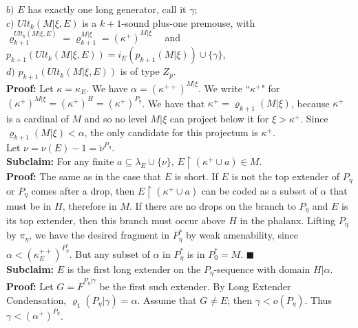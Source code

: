 \documentclass[12pt]{article}
\begin{document}
\indent $b)$ $E$ has exactly one long generator, call it $\gamma$;\\

\indent $c)$ $Ult_k (M | \xi , E)$ is a $k+1$-sound plus-one premouse, with\\

\indent \indent $\varrho_{k+1}^{Ult_k (M | \xi , E)} = \varrho_{k+1}^{M | \xi} = (\kappa^+ )^{M | \xi}$ \ \ and \ \ $p_{k+1} (Ult_k (M | \xi , E )) = i_E (p_{k+1} (M | \xi)) \cup \{ \gamma \}$,\\

\indent $d)$ $p_{k+1} (Ult_k (M | \xi , E))$ is of type $Z_p$.\\

\indent \indent \textbf{Proof:} Let $\kappa = \kappa_E$.  We have $\alpha = (\kappa^{++})^{M | \xi}$.  We write ``$\kappa^+$" for $(\kappa^+ )^{M | \xi} = (\kappa^+)^H = (\kappa^+)^{P_\eta}$.  We have that $\kappa^+ = \varrho_{k+1} (M | \xi)$, because $\kappa^+$ is a cardinal of $M$ and so no level $M | \xi$ can project below it for $\xi > \kappa^+$.  Since $\varrho_{k+1} (M | \xi ) < \alpha$, the only candidate for this projectum is $\kappa^+$.\\

Let $\nu = \nu(E) - 1 = \dot{\nu}^{P_\eta}$.\\

\textbf{Subclaim:} For any finite $a \subseteq \lambda_E \cup \{ \nu \}$, $E \restriction ( \kappa^+ \cup a ) \in M$.\\

\indent \indent \textbf{Proof:}  The same as in the case that $E$ is short.  If $E$ is not the top extender of $P_\eta$ or $P_\eta$ comes after a drop, then $E \restriction ( \kappa^+ \cup a )$ can be coded as a subset of $\alpha$ that must be in $H$, therefore in $M$.  If there are no drops on the branch to $P_\eta$ and $E$ is its top extender, then this branch must occur above $H$ in the phalanx.  Lifting $P_\eta$ by $\pi_\eta$, we have the desired fragment in $P^*_\eta$ by weak amenability, since $\alpha < (\kappa_E^{++})^{P^*_\eta}$.  But any subset of $\alpha$ in $P^*_\eta$ is in $P^*_0 = M$. $\blacksquare$\\

\textbf{Subclaim:} $E$ is the first long extender on the $P_\eta$-sequence with domain $H | \alpha$.\\

\indent \indent \textbf{Proof:} Let $G = \dot{F}^{P_\eta | \gamma}$ be the first such extender.  By Long Extender Condensation, $\varrho_1 (P_\eta | \gamma ) = \alpha$.  Assume that $G \neq E$; then $\gamma < o (P_\eta)$.  Thus $\gamma < (\alpha^+ )^{P_\eta}$.\\
\end{document}
